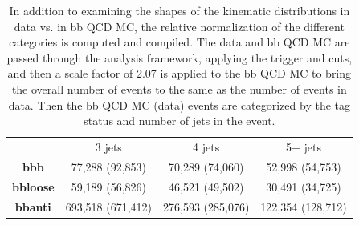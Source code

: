 \begin{table}
    \begin{center}
    \caption{In addition to examining the shapes of the kinematic distributions
    in data vs. in bb QCD MC, the relative normalization of the different categories
    is computed and compiled.  The data and bb QCD MC are passed through the analysis
    framework, applying the trigger and cuts, and then a scale factor of 2.07 is applied
    to the bb QCD MC to bring the overall number of events to the same as the number of
    events in data.  Then the bb QCD MC (data) events are categorized by the tag status
    and number of jets in the event. \label{tab:bb_qcd_mc_categories}}
        \begin{tabular}{ c c c c }
                         & 3 jets            & 4 jets            & 5+ jets \\
        \textbf{bbb}     & 77,288 (92,853)   & 70,289 (74,060)   & 52,998 (54,753) \\
        \textbf{bbloose} & 59,189 (56,826)   & 46,521 (49,502)   & 30,491 (34,725) \\
        \textbf{bbanti}  & 693,518 (671,412) & 276,593 (285,076) & 122,354 (128,712) \\
        \end{tabular}
    \end{center}
\end{table}




